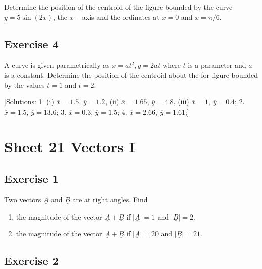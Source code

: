 \documentclass[
  english,
  11pt,
  oneside]{book}
\providecommand{\tightlist}{%
  \setlength{\itemsep}{0pt}\setlength{\parskip}{0pt}}
\newcommand{\slide}{}
\theoremstyle{definition}
\theoremstyle{definition}
\theoremstyle{definition}
\theoremstyle{definition}
\theoremstyle{remark}
\begin{document}
Determine the position of the centroid of the figure bounded by the curve \(y = 5\sin(2x)\), the \(x-\)axis and the ordinates at \(x = 0\) and \(x = \pi/6\).

\slide

\subsection*{Exercise 4}\label{exercise-4-7}

A curve is given parametrically as \(x = at^2, y = 2at\) where \(t\) is a parameter and \(a\) is a constant. Determine the position of the centroid about the for figure bounded by the values \(t = 1\) and \(t = 2\).

{[}Solutions:
1.
(i) \(\overline{x}=1.5\), \(\overline{y}=1.2\),
(ii) \(\overline{x}=1.65\), \(\overline{y}=4.8\),
(iii) \(\overline{x}=1\), \(\overline{y}=0.4\);
2. \(\overline{x}=1.5\), \(\overline{y}=13.6\);
3. \(\overline{x}=0.3\), \(\overline{y}=1.5\);
4. \(\overline{x}=2.66\), \(\overline{y}=1.61\);{]}

\slide

\section{Sheet 21 Vectors I}\label{sheet-21-vectors-i}

\subsection*{Exercise 1}\label{exercise-1-12}

Two vectors \(\underline A\) and \(\underline B\) are at right angles. Find

\begin{enumerate}
\def\labelenumi{\roman{enumi}.}
\tightlist
\item
  the magnitude of the vector \(\underline A+\underline B\) if \(|\underline A| = 1\) and \(|\underline B| = 2\).
\item
  the magnitude of the vector \(\underline A+\underline B\) if \(|\underline A|=20\) and \(|\underline B| = 21\).
\end{enumerate}

\slide

\subsection*{Exercise 2}\label{exercise-2-12}
\end{document}
